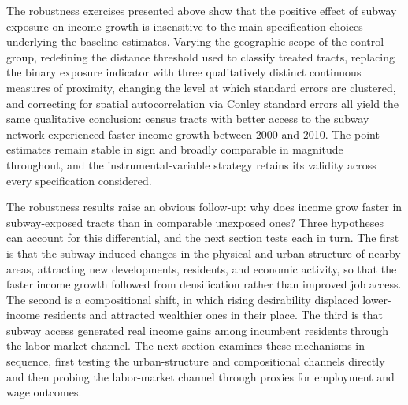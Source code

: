 The robustness exercises presented above show that the positive effect of subway exposure on income growth is insensitive to the main specification choices underlying the baseline estimates. Varying the geographic scope of the control group, redefining the distance threshold used to classify treated tracts, replacing the binary exposure indicator with three qualitatively distinct continuous measures of proximity, changing the level at which standard errors are clustered, and correcting for spatial autocorrelation via Conley standard errors all yield the same qualitative conclusion: census tracts with better access to the subway network experienced faster income growth between 2000 and 2010. The point estimates remain stable in sign and broadly comparable in magnitude throughout, and the instrumental-variable strategy retains its validity across every specification considered.

The robustness results raise an obvious follow-up: why does income grow faster in subway-exposed tracts than in comparable unexposed ones? Three hypotheses can account for this differential, and the next section tests each in turn. The first is that the subway induced changes in the physical and urban structure of nearby areas, attracting new developments, residents, and economic activity, so that the faster income growth followed from densification rather than improved job access. The second is a compositional shift, in which rising desirability displaced lower-income residents and attracted wealthier ones in their place. The third is that subway access generated real income gains among incumbent residents through the labor-market channel. The next section examines these mechanisms in sequence, first testing the urban-structure and compositional channels directly and then probing the labor-market channel through proxies for employment and wage outcomes.

